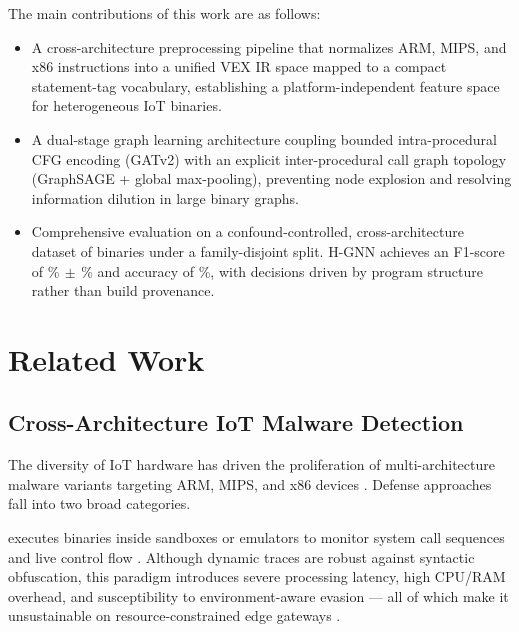 \documentclass[conference]{IEEEtran}
\begin{document}
The main contributions of this work are as follows:
\begin{itemize}
    \item {} A
    cross-architecture preprocessing pipeline that normalizes
    ARM, MIPS, and x86 instructions into a unified
    VEX IR space mapped to a compact statement-tag vocabulary, establishing
    a platform-independent feature space for heterogeneous IoT
    binaries.

    \item {}
    A dual-stage graph learning architecture coupling bounded
    intra-procedural CFG encoding (GATv2) with an explicit 
    inter-procedural call graph topology (GraphSAGE + global max-pooling),
    preventing node explosion and resolving information dilution
    in large binary graphs.

    \item {} Comprehensive
    evaluation on a confound-controlled, cross-architecture dataset of \dsTotal{} binaries under a family-disjoint split.
    H-GNN achieves an F1-score of \hgnnF\%$\,\pm\,$\hgnnFstd\% and accuracy of \hgnnAcc\%,
    with decisions driven by program structure rather than build provenance.
\end{itemize}


\section{Related Work}
\label{sec:related_work}

\subsection{Cross-Architecture IoT Malware Detection}

The diversity of IoT hardware has driven the proliferation of
multi-architecture malware variants targeting ARM, MIPS, and
x86 devices \cite{b1}. Defense approaches fall into two broad
categories.

 executes binaries inside sandboxes
or emulators to monitor system call sequences and live control
flow \cite{b3,b9}. Although dynamic traces are robust against
syntactic obfuscation, this paradigm introduces severe
processing latency, high CPU/RAM overhead, and susceptibility
to environment-aware evasion — all of which make it
unsustainable on resource-constrained edge gateways \cite{b2}.
\end{document}
